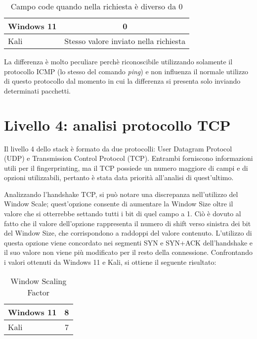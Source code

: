 \begin{table}[h]
	\centering
	\begin{tabular}{ | l | c |}
		\hline
		\rowcolor{blue!10} Windows 11 & 0
		\\
		\hline
		\rowcolor{red!10} Kali & Stesso valore inviato nella richiesta
		\\
		\hline

	\end{tabular}
	\caption{Campo code quando nella richiesta è diverso da 0}
	\label{tab:code}
\end{table}

La differenza è molto peculiare perchè riconoscibile utilizzando solamente il protocollo ICMP (lo stesso del comando \textit{ping}) e non influenza il normale utilizzo di questo protocollo dal momento in cui la differenza si presenta solo inviando determinati pacchetti.
\section{Livello 4: analisi protocollo TCP}
Il livello 4 dello stack è formato da due protocolli: User Datagram Protocol (UDP) e Transmission Control Protocol (TCP). Entrambi forniscono informazioni utili per il fingerprinting, ma il TCP possiede un numero maggiore di campi e di opzioni utilizzabili, pertanto è stata data priorità all'analisi di quest'ultimo.

Analizzando l'handshake TCP, si può notare una discrepanza nell'utilizzo del Window Scale; quest'opzione consente di aumentare la Window Size oltre il valore che si otterrebbe settando tutti i bit di quel campo a 1.
Ciò è dovuto al fatto che il valore dell'opzione rappresenta il numero di shift verso sinistra dei bit del Window Size, che corrispondono a raddoppi del valore contenuto. 
L'utilizzo di questa opzione viene concordato nei segmenti SYN e SYN+ACK dell'handshake e il suo valore non viene più modificato per il resto della connessione. Confrontando i valori ottenuti da Windows 11 e Kali, si ottiene il seguente risultato:
\\
\begin{table}[htb]
	\centering
	\begin{tabular}{| l | c |}
		\hline
		\rowcolor{blue!10} Windows 11 & 8
		\\
		\hline
		\rowcolor{red!10} Kali & 7
		\\
		\hline
		
	\end{tabular}
	\caption{Window Scaling Factor}
	\label{tab:Window Scale}
\end{table}

